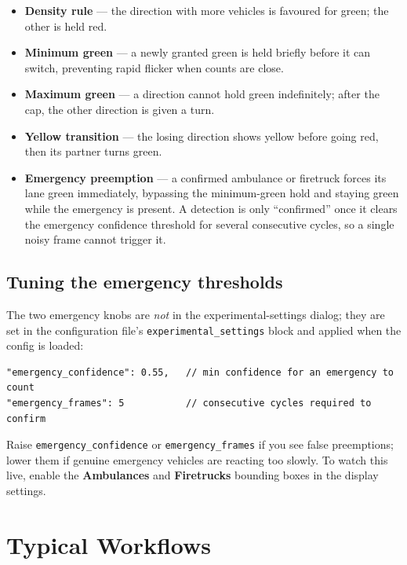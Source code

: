 \documentclass[11pt]{article}
\newcommand{\code}[1]{\texttt{#1}}
\newcommand{\ui}[1]{\textbf{#1}}
\begin{document}
\begin{itemize}[nosep]
  \item \textbf{Density rule} --- the direction with more vehicles is favoured
        for green; the other is held red.
  \item \textbf{Minimum green} --- a newly granted green is held briefly before
        it can switch, preventing rapid flicker when counts are close.
  \item \textbf{Maximum green} --- a direction cannot hold green indefinitely;
        after the cap, the other direction is given a turn.
  \item \textbf{Yellow transition} --- the losing direction shows yellow before
        going red, then its partner turns green.
  \item \textbf{Emergency preemption} --- a confirmed ambulance or firetruck
        forces its lane green immediately, bypassing the minimum-green hold and
        staying green while the emergency is present. A detection is only
        ``confirmed'' once it clears the emergency confidence threshold for
        several consecutive cycles, so a single noisy frame cannot trigger it.
\end{itemize}

\subsection{Tuning the emergency thresholds}
The two emergency knobs are \emph{not} in the experimental-settings dialog; they
are set in the configuration file's \code{experimental\_settings} block and
applied when the config is loaded:
\begin{lstlisting}
"emergency_confidence": 0.55,   // min confidence for an emergency to count
"emergency_frames": 5           // consecutive cycles required to confirm
\end{lstlisting}
Raise \code{emergency\_confidence} or \code{emergency\_frames} if you see false
preemptions; lower them if genuine emergency vehicles are reacting too slowly.
To watch this live, enable the \ui{Ambulances} and \ui{Firetrucks} bounding
boxes in the display settings.

\section{Typical Workflows}
\end{document}
